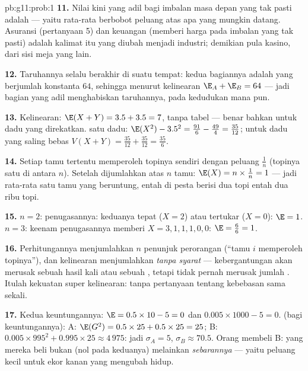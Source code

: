 \begin{solution}{pb:g11:prob:1}
\textbf{11.} Nilai kini yang adil bagi imbalan masa depan yang tak pasti
adalah  --- yaitu rata-rata berbobot peluang atas
apa yang mungkin datang. Asuransi (pertanyaan 5) dan keuangan (memberi harga
pada imbalan yang tak pasti) adalah kalimat itu yang diubah menjadi industri;
demikian pula kasino, dari sisi meja yang lain.

\textbf{12.} Taruhannya selalu berakhir di suatu tempat: kedua bagiannya
adalah  yang berjumlah konstanta $64$, sehingga menurut
kelinearan $\E_A + \E_B = 64$ --- jadi bagian yang adil menghabiskan taruhannya,
pada kedudukan mana pun.

\textbf{13.} Kelinearan: $\E(X + Y) = 3.5 + 3.5 = 7$, tanpa tabel
--- benar bahkan untuk dadu yang direkatkan.  satu dadu:
$\E(X^2) - 3.5^2 = \frac{91}{6} - \frac{49}{4} = \frac{35}{12}$;
untuk dadu yang saling bebas
$V(X + Y) = \frac{35}{12} + \frac{35}{12} = \frac{35}{6}$.

\textbf{14.} Setiap tamu tertentu memperoleh topinya sendiri dengan
peluang $\frac1n$ (topinya satu di antara $n$). Setelah dijumlahkan
atas $n$ tamu:
$\E(X) = n \times \frac1n = 1$ --- jadi rata-rata satu tamu yang beruntung,
entah di pesta berisi dua topi entah dua ribu topi.

\textbf{15.} $n = 2$: penugasannya: keduanya tepat ($X = 2$) atau
tertukar ($X = 0$): $\E = 1$. $n = 3$: keenam penugasannya memberi
$X = 3, 1, 1, 1, 0, 0$: $\E = \frac{6}{6} = 1$.

\textbf{16.} Perhitungannya menjumlahkan  $n$
penunjuk perorangan (``tamu $i$ memperoleh topinya''), dan
kelinearan menjumlahkan  \emph{tanpa syarat} ---
kebergantungan akan merusak sebuah hasil kali atau sebuah , tetapi tidak
pernah merusak jumlah . Itulah kekuatan super kelinearan: tanpa
pertanyaan tentang kebebasan sama sekali.

\textbf{17.} Kedua keuntungannya: $\E = 0.5 \times 10 - 5 = 0$ dan
$0.005 \times 1000 - 5 = 0$.  (bagi keuntungannya):
A: $\E(G^2) = 0.5 \times 25 + 0.5 \times 25 = 25$;
B: $0.005 \times 995^2 + 0.995 \times 25 \approx 4\,975$:
jadi $\sigma_A = 5$, $\sigma_B \approx 70.5$. Orang membeli B: yang
mereka beli bukan  (nol pada keduanya) melainkan
\emph{sebarannya} --- yaitu peluang kecil untuk ekor kanan yang mengubah
hidup.


\end{solution}
